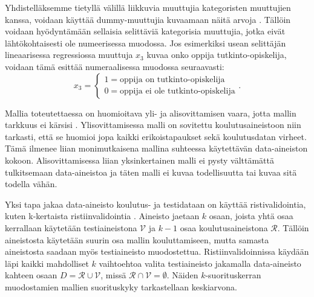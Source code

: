 Yhdistelläksemme tietyllä välillä liikkuvia muuttujia kategoristen muuttujien kanssa, voidaan käyttää dummy-muuttujia kuvaamaan näitä arvoja \citep{rossIntroductoryStatistics2017}. Tällöin voidaan hyödyntämään sellaisia selittäviä kategorisia muuttujia, jotka eivät lähtökohtaisesti ole numeerisessa muodossa. Jos esimerkiksi usean selittäjän lineaarisessa regressiossa muuttuja $x_3$ kuvaa onko oppija tutkinto-opiskelija, voidaan tämä esittää numeraalisessa muodossa seuraavasti: $$x_3 = \begin{cases}1 = \text{oppija on tutkinto-opiskelija} \\ 0 = \text{oppija ei ole tutkinto-opiskelija}\end{cases}.$$

Mallia toteutettaessa on huomioitava yli- ja alisovittamisen vaara, jotta mallin tarkkuus ei kärsisi \citep{hamalainenClassifiersEducationalData2010}. Ylisovittamisessa malli on sovitettu koulutusaineistoon niin tarkasti, että se huomioi jopa kaikki erikoistapaukset sekä koulutusdatan virheet. Tämä ilmenee liian monimutkaisena mallina suhteessa käytettävän data-aineiston kokoon. Alisovittamisessa liian yksinkertainen malli ei pysty välttämättä tulkitsemaan data-aineistoa ja täten malli ei kuvaa todellisuutta tai kuvaa sitä todella vähän.

Yksi tapa jakaa data-aineisto koulutus- ja testidataan on käyttää ristivalidointia, kuten k-kertaista ristiinvalidointia \citep{deisenrothMathematicsMachineLearning2020}. Aineisto jaetaan $k$ osaan, joista yhtä osaa kerrallaan käytetään testiaineistona $\mathcal{V}$ ja $k-1$ osaa koulutusaineistona $\mathcal{R}$. Tällöin aineistosta käytetään suurin osa mallin kouluttamiseen, mutta samasta aineistosta saadaan myös testiaineisto muodostettua. Ristiinvalidoinnissa käydään läpi kaikki mahdolliset $k$ vaihtoehtoa valita testiaineisto jakamalla data-aineisto kahteen osaan $D = \mathcal{R} \cup \mathcal{V}$, missä $\mathcal{R} \cap \mathcal{V} = \emptyset$. Näiden $k$-suorituskerran muodostamien mallien suorituskyky tarkastellaan keskiarvona.

